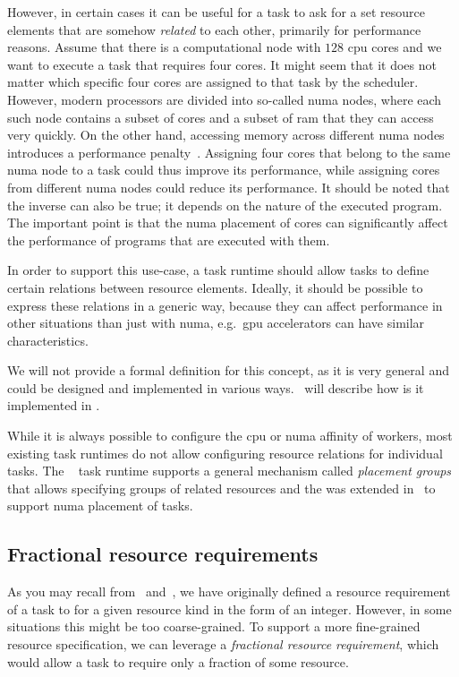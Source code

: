 However, in certain cases it can be useful for a task to ask for a set resource elements that are
somehow \emph{related} to each other, primarily for performance reasons. Assume that there
is a computational node with $128$ \gls{cpu} cores and we want to
execute a task that requires four cores. It might seem that it does not matter which specific four
cores are assigned to that task by the scheduler. However, modern processors are divided into
so-called \gls{numa} nodes, where each such node contains a subset of cores and a
subset of \gls{ram} that they can access very quickly. On the other hand, accessing
memory across different \gls{numa} nodes introduces a performance
penalty~\cite{numa_effect}. Assigning four cores that belong to the same
\gls{numa} node to a task could thus improve its performance, while
assigning cores from different \gls{numa} nodes could reduce its
performance. It should be noted that the inverse can also be true; it depends on the
nature of the executed program. The important point is that the \gls{numa} placement of cores
can significantly affect the performance of programs that are executed with them.

In order to support this use-case, a task runtime should allow tasks to define certain relations
between resource elements. Ideally, it should be possible to express these relations in a generic
way, because they can affect performance in other situations than just with
\gls{numa}, e.g.\ \gls{gpu} accelerators can have similar
characteristics.

We will not provide a formal definition for this concept, as it is very general and could be
designed and implemented in various ways.~ will describe how is it
implemented in \hyperqueue{}.

While it is always possible to configure the \gls{cpu} or \gls{numa}
affinity of workers, most existing task runtimes do not allow configuring resource relations for
individual tasks. The \ray{}~\cite{ray} task runtime supports a
general mechanism called \emph{placement groups} that allows specifying groups of related
resources and the \pycompss{} was extended in~\cite{pycompss_numa} to support
\gls{numa} placement of tasks.

\subsection{Fractional resource requirements}
As you may recall from~ and~, we have
originally defined a resource requirement of a task to for a given resource kind in the form of an integer. However, in some situations this might be too coarse-grained. To
support a more fine-grained resource specification, we can leverage a \emph{fractional resource requirement},
which would allow a task to require only a fraction of some resource.

